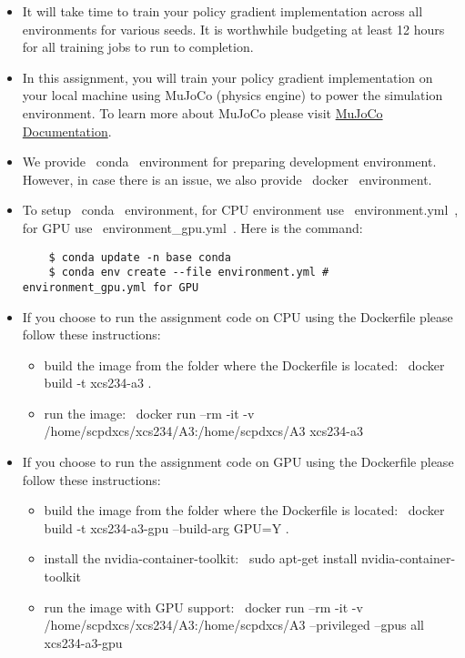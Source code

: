 \begin{itemize}
  \item It will take time to train your policy gradient implementation across all environments for various seeds. It is worthwhile budgeting at least 12 hours for all training jobs to run to completion.

  \item In this assignment, you will train your policy gradient implementation on your local machine using MuJoCo (physics engine) to power the simulation environment. To learn more about MuJoCo please visit \href{https://mujoco.readthedocs.io/en/latest/overview.html}{MuJoCo Documentation}.

  \item We provide ~conda~ environment for preparing development environment. However, in case there is an issue, we also provide ~docker~ environment.

  \item To setup ~conda~ environment, for CPU environment use ~environment.yml~, for GPU use ~environment_gpu.yml~. Here is the command:
    \begin{lstlisting}
    $ conda update -n base conda
    $ conda env create --file environment.yml #  environment_gpu.yml for GPU
    \end{lstlisting}
  \item If you choose to run the assignment code on CPU using the Dockerfile please follow these instructions:
    \begin{itemize}
        \item build the image from the folder where the Dockerfile is located: ~docker build -t xcs234-a3 .~
        \item run the image:  ~docker run --rm -it -v /home/scpdxcs/xcs234/A3:/home/scpdxcs/A3 xcs234-a3~
    \end{itemize}

  \item If you choose to run the assignment code on GPU using the Dockerfile please follow these instructions:
    \begin{itemize}
        \item build the image from the folder where the Dockerfile is located: ~docker build -t xcs234-a3-gpu --build-arg GPU=Y .~
        \item install the nvidia-container-toolkit: ~sudo apt-get install nvidia-container-toolkit~
        \item run the image with GPU support: ~docker run --rm -it -v /home/scpdxcs/xcs234/A3:/home/scpdxcs/A3 --privileged --gpus all xcs234-a3-gpu~
    \end{itemize}


\end{itemize}

